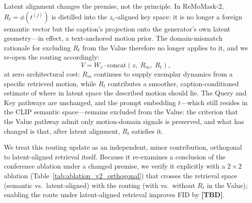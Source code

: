 \documentclass[10pt,journal,compsoc]{IEEEtran}
\begin{document}
Latent alignment changes the premise, not the principle. In ReMoMask-2, $R_t = \phi(t^{(j)})$ is distilled into the $z_e$-aligned key space: it is no longer a foreign semantic vector but the caption's projection onto the generator's own latent geometry---in effect, a text-anchored motion prior. The domain-mismatch rationale for excluding $R_t$ from the Value therefore no longer applies to it, and we re-open the routing accordingly:
\begin{equation}
V = W_v \cdot
\mathrm{concat}\!\left(z,\; R_m,\; R_t\right),
\end{equation}
at zero architectural cost: $R_m$ continues to supply exemplar dynamics from a specific retrieved motion, while $R_t$ contributes a smoother, caption-conditioned estimate of where in latent space the described motion should lie. The Query and Key pathways are unchanged, and the prompt embedding $t$---which still resides in the CLIP semantic space---remains excluded from the Value: the criterion that the Value pathway admit only motion-domain signals is preserved, and what has changed is that, after latent alignment, $R_t$ satisfies it.

We treat this routing update as an independent, minor contribution, orthogonal to latent-aligned retrieval itself. Because it re-examines a conclusion of the conference ablation under a changed premise, we verify it explicitly with a $2{\times}2$ ablation (Table~\ref{tab:ablation_v2_orthogonal}) that crosses the retrieval space (semantic vs.\ latent-aligned) with the routing (with vs.\ without $R_t$ in the Value); enabling the route under latent-aligned retrieval improves FID by \textbf{[TBD]}.
\end{document}
